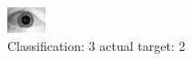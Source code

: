 \begin{figure}[h!]
\begin{center}
\includegraphics[width=0.60\columnwidth]{figures/ID1704_class_3_target_2.png}
\end{center}
\caption{ Classification: 3 actual target: 2}
\label{fig:ID1704_class_3_target_2}
\end{figure}
